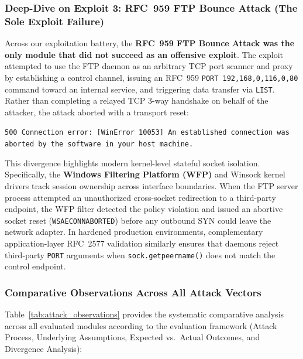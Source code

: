 \subsubsection{Deep-Dive on Exploit 3: RFC~959 FTP Bounce Attack (The Sole Exploit Failure)}
Across our exploitation battery, the \textbf{RFC~959 FTP Bounce Attack was the only module that did not succeed as an offensive exploit}. The exploit attempted to use the FTP daemon as an arbitrary TCP port scanner and proxy by establishing a control channel, issuing an RFC~959 \texttt{PORT 192,168,0,116,0,80} command toward an internal service, and triggering data transfer via \texttt{LIST}. Rather than completing a relayed TCP 3-way handshake on behalf of the attacker, the attack aborted with a transport reset:
\begin{center}\vspace{-3pt}
\small\texttt{500 Connection error: [WinError 10053] An established connection was aborted by the software in your host machine.}
\vspace{-3pt}\end{center}
This divergence highlights modern kernel-level stateful socket isolation. Specifically, the \textbf{Windows Filtering Platform (WFP)} and Winsock kernel drivers track session ownership across interface boundaries. When the FTP server process attempted an unauthorized cross-socket redirection to a third-party endpoint, the WFP filter detected the policy violation and issued an abortive socket reset (\texttt{WSAECONNABORTED}) before any outbound SYN could leave the network adapter. In hardened production environments, complementary application-layer RFC~2577 validation similarly ensures that daemons reject third-party \texttt{PORT} arguments when \texttt{sock.getpeername()} does not match the control endpoint.

\subsubsection{Comparative Observations Across All Attack Vectors}
Table~\ref{tab:attack_observations} provides the systematic comparative analysis across all evaluated modules according to the evaluation framework (Attack Process, Underlying Assumptions, Expected vs.\ Actual Outcomes, and Divergence Analysis):

